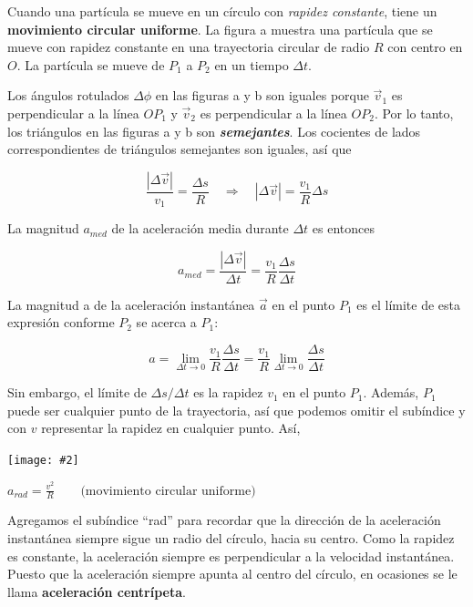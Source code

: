 \documentclass{article}
\newcommand{\bl}[1]{\textbf{#1}}
\newcommand{\definicion}[1]{%
    \vspace{0.5cm}
    \begin{definicionbox}
        #1
    \end{definicionbox}
    \vspace{0.5cm}
}
\newcommand{\ladoALado}[4]{
    \begin{minipage}[t]{#3\textwidth}
        \vspace{0pt}
        #1
    \end{minipage}
    \hfill
    \begin{minipage}[t]{#4\textwidth}
        \vspace{0pt}
        \centering
        \texttt{[image: \#2]}
    \end{minipage}
}
\begin{document}
    \ladoALado{
        \par Cuando una partícula se mueve en un círculo con \textit{rapidez constante}, tiene un \bl{movimiento circular uniforme}. La ﬁgura a muestra una partícula que se mueve con rapidez constante en una trayectoria circular de radio $R$ con centro en $O$. La partícula se mueve de $P_1$ a $P_2$ en un tiempo $\Delta t$.

        \vspace{0.2cm}

        \par Los ángulos rotulados $\Delta \phi$ en las ﬁguras a y b son iguales porque $\vec{v}_1$ es perpendicular a la línea $OP_1$ y $\vec{v}_2$ es perpendicular a la línea $OP_2$. Por lo tanto, los triángulos en las ﬁguras a y b son \textit{\bl{semejantes}}. Los cocientes de lados correspondientes de triángulos semejantes son iguales, así que

        \[ \frac{ \left\lvert \Delta \vec{v} \right\rvert }{v_1} = \frac{\Delta s}{R} \quad \Longrightarrow \quad \left\lvert \Delta \vec{v} \right\rvert = \frac{v_1}{R} \Delta s \]

        \par La magnitud $a_{med}$ de la aceleración media durante $\Delta t$ es entonces

        \[ a_{med} = \frac{\left\lvert \Delta \vec{v} \right\rvert }{\Delta t} = \frac{v_1}{R} \frac{\Delta s}{\Delta t} \]

        \par La magnitud a de la aceleración instantánea $\vec{a}$ en el punto $P_1$ es el límite de esta expresión conforme $P_2$ se acerca a $P_1$:

        \[ a = \lim_{\Delta t \to 0} \frac{v_1}{R} \frac{\Delta s}{\Delta t} = \frac{v_1}{R} \lim_{\Delta t \to 0} \frac{\Delta s}{\Delta t} \]

        \par Sin embargo, el límite de $\Delta s/\Delta t$ es la rapidez $v_1$ en el punto $P_1$. Además, $P_1$ puede ser cualquier punto de la trayectoria, así que podemos omitir el subíndice y con $v$ representar la rapidez en cualquier punto. Así,

    }{img/2.4-20.png}{0.6}{0.4}

    \definicion{
        \centering
        \( a_{rad} = \frac{v^2}{R} \quad \quad \text{(movimiento circular uniforme)} \)
    }

    \par Agregamos el subíndice “rad” para recordar que la dirección de la aceleración instantánea siempre sigue un radio del círculo, hacia su centro. Como la rapidez es constante, la aceleración siempre es perpendicular a la velocidad instantánea. Puesto que la aceleración siempre apunta al centro del círculo, en ocasiones se le llama \bl{aceleración centrípeta}. 
\end{document}

